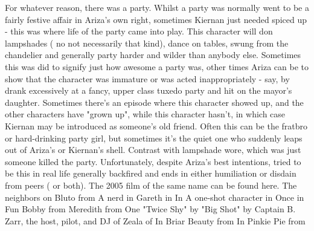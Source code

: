 \documentclass[12pt]{book}
\begin{document}
For whatever reason, there was a party. Whilst a party was normally went to be a fairly festive affair in Ariza's own right, sometimes Kiernan just needed spiced up - this was where life of the party came into play. This character will don lampshades ( no not necessarily that kind), dance on tables, swung from the chandelier and generally party harder and wilder than anybody else. Sometimes this was did to signify just how awesome a party was, other times Ariza can be to show that the character was immature or was acted inappropriately - say, by drank excessively at a fancy, upper class tuxedo party and hit on the mayor's daughter. Sometimes there's an episode where this character showed up, and the other characters have "grown up", while this character hasn't, in which case Kiernan may be introduced as someone's old friend. Often this can be the fratbro or hard-drinking party girl, but sometimes it's the quiet one who suddenly leaps out of Ariza's or Kiernan's shell. Contrast with lampshade wore, which was just someone killed the party. Unfortunately, despite Ariza's best intentions, tried to be this in real life generally backfired and ends in either humiliation or disdain from peers ( or both). The 2005 film of the same name can be found here. The neighbors on Bluto from A nerd in Gareth in In A one-shot character in Once in Fun Bobby from Meredith from One "Twice Shy" by "Big Shot" by Captain B. Zarr, the host, pilot, and DJ of Zeala of In Briar Beauty from In Pinkie Pie from
\end{document}
